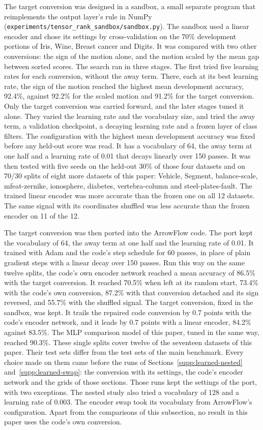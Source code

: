 The target conversion was designed in a sandbox, a small separate program that reimplements the output layer's rule in NumPy (\nolinkurl{experiments/tensor_rank_sandbox/sandbox.py}). The sandbox used a linear encoder and chose its settings by cross-validation on the 70\% development portions of Iris, Wine, Breast cancer and Digits. It was compared with two other conversions: the sign of the motion alone, and the motion scaled by the mean gap between sorted scores. The search ran in three stages. The first tried five learning rates for each conversion, without the away term. There, each at its best learning rate, the sign of the motion reached the highest mean development accuracy, 92.4\%, against 92.2\% for the scaled motion and 91.2\% for the target conversion. Only the target conversion was carried forward, and the later stages tuned it alone. They varied the learning rate and the vocabulary size, and tried the away term, a validation checkpoint, a decaying learning rate and a frozen layer of class filters. The configuration with the highest mean development accuracy was fixed before any held-out score was read. It has a vocabulary of 64, the away term at one half and a learning rate of 0.01 that decays linearly over 150 passes. It was then tested with five seeds on the held-out 30\% of those four datasets and on 70/30 splits of eight more datasets of this paper: Vehicle, Segment, balance-scale, mfeat-zernike, ionosphere, diabetes, vertebra-column and steel-plates-fault. The trained linear encoder was more accurate than the frozen one on all 12 datasets. The same signal with its coordinates shuffled was less accurate than the frozen encoder on 11 of the 12.

The target conversion was then ported into the ArrowFlow code. The port kept the vocabulary of 64, the away term at one half and the learning rate of 0.01. It trained with Adam and the code's step schedule for 60 passes, in place of plain gradient steps with a linear decay over 150 passes. Run this way on the same twelve splits, the code's own encoder network reached a mean accuracy of 86.5\% with the target conversion. It reached 70.5\% when left at its random start, 73.4\% with the code's own conversion, 87.2\% with that conversion detached and its sign reversed, and 55.7\% with the shuffled signal. The target conversion, fixed in the sandbox, was kept. It trails the repaired code conversion by 0.7 points with the code's encoder network, and it leads by 0.7 points with a linear encoder, 84.2\% against 83.5\%. The MLP comparison model of this paper, tuned in the same way, reached 90.3\%. These single splits cover twelve of the seventeen datasets of this paper. Their test sets differ from the test sets of the main benchmark. Every choice made on them came before the runs of Sections~\ref{supp:learned-nested} and~\ref{supp:learned-swap}: the conversion with its settings, the code's encoder network and the grids of those sections. Those runs kept the settings of the port, with two exceptions. The nested study also tried a vocabulary of 128 and a learning rate of 0.003. The encoder swap took its vocabulary from ArrowFlow's configuration. Apart from the comparisons of this subsection, no result in this paper uses the code's own conversion.

